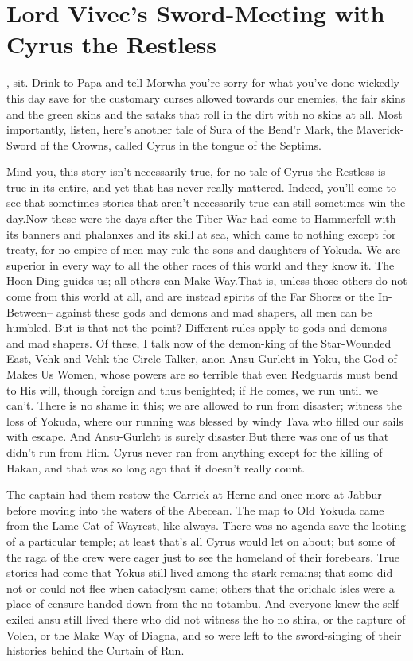 \chapter*{\headerfont Lord Vivec's Sword-Meeting with Cyrus the Restless}

, sit. Drink to Papa and tell Morwha you’re sorry for what you’ve done wickedly this day save for the customary curses allowed towards our enemies, the fair skins and the green skins and the sataks that roll in the dirt with no skins at all. Most importantly, listen, here’s another tale of Sura of the Bend’r Mark, the Maverick-Sword of the Crowns, called Cyrus in the tongue of the Septims.

Mind you, this story isn’t necessarily true, for no tale of Cyrus the Restless is true in its entire, and yet that has never really mattered. Indeed, you’ll come to see that sometimes stories that aren’t necessarily true can still sometimes win the day.Now these were the days after the Tiber War had come to Hammerfell with its banners and phalanxes and its skill at sea, which came to nothing except for treaty, for no empire of men may rule the sons and daughters of Yokuda. We are superior in every way to all the other races of this world and they know it. The Hoon Ding guides us; all others can Make Way.That is, unless those others do not come from this world at all, and are instead spirits of the Far Shores or the In-Between-- against these gods and demons and mad shapers, all men can be humbled. But is that not the point? Different rules apply to gods and demons and mad shapers. Of these, I talk now of the demon-king of the Star-Wounded East, Vehk and Vehk the Circle Talker, anon Ansu-Gurleht in Yoku, the God of Makes Us Women, whose powers are so terrible that even Redguards must bend to His will, though foreign and thus benighted; if He comes, we run until we can’t. There is no shame in this; we are allowed to run from disaster; witness the loss of Yokuda, where our running was blessed by windy Tava who filled our sails with escape. And Ansu-Gurleht is surely disaster.But there was one of us that didn’t run from Him. Cyrus never ran from anything except for the killing of Hakan, and that was so long ago that it doesn’t really count.

\sectionline

The captain had them restow the Carrick at Herne and once more at Jabbur before moving into the waters of the Abecean. The map to Old Yokuda came from the Lame Cat of Wayrest, like always. There was no agenda save the looting of a particular temple; at least that’s all Cyrus would let on about; but some of the raga of the crew were eager just to see the homeland of their forebears. True stories had come that Yokus still lived among the stark remains; that some did not or could not flee when cataclysm came; others that the orichalc isles were a place of censure handed down from the no-totambu. And everyone knew the self-exiled ansu still lived there who did not witness the ho no shira, or the capture of Volen, or the Make Way of Diagna, and so were left to the sword-singing of their histories behind the Curtain of Run.

